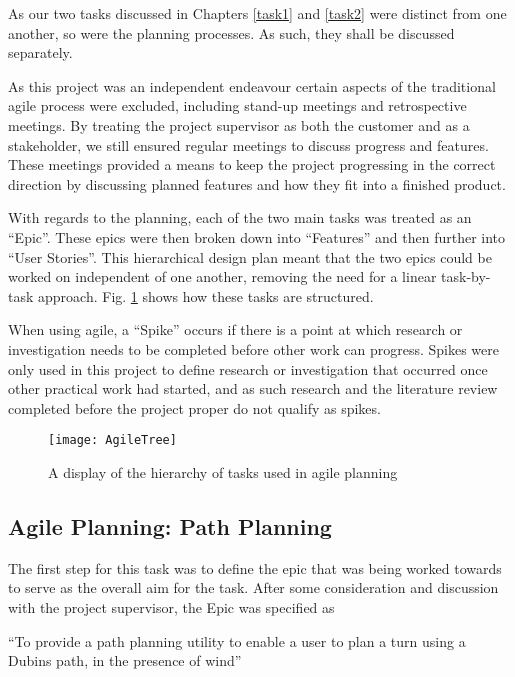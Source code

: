 As our two tasks discussed in Chapters \ref{task1} and \ref{task2} were distinct from one another, so were the planning processes. As such, they shall be discussed separately.

As this project was an independent endeavour certain aspects of the traditional agile process were excluded, including stand-up meetings and retrospective meetings. By treating the project supervisor as both the customer and as a stakeholder, we still ensured regular meetings to discuss progress and features. These meetings provided a means to keep the project progressing in the correct direction by discussing planned features and how they fit into a finished product.

With regards to the planning, each of the two main tasks was treated as an ``Epic''. These epics were then broken down into ``Features'' and then further into ``User Stories''. This hierarchical design plan meant that the two epics could be worked on independent of one another, removing the need for a linear task-by-task approach. Fig. \ref{fig:AgileTree} shows how these tasks are structured. 

When using agile, a ``Spike'' occurs if there is a point at which research or investigation needs to be completed before other work can progress. Spikes were only used in this project to define research or investigation that occurred once other practical work had started, and as such research and the literature review completed before the project proper do not qualify as spikes.

\begin{figure}[htbp!] 
\centering    
\texttt{[image: AgileTree]}
\caption[Agile planning task breakdown]{A display of the hierarchy of tasks used in agile planning}
\label{fig:AgileTree}
\end{figure} 


\subsection{Agile Planning: Path Planning}
\label{planning:agile:planning}

The first step for this task was to define the epic that was being worked towards to serve as the overall aim for the task. After some consideration and discussion with the project supervisor, the Epic was specified as

\begin{displayquote}
	``To provide a path planning utility to enable a user to plan a turn using a Dubins path, in the presence of wind''
\end{displayquote}

